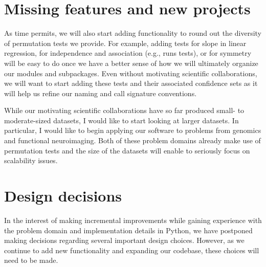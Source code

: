 %
%
%
%
%
%
%
%
%
%
%
%
%
%
%
%

\section{Missing features and new projects}

As time permits, we will also start adding functionality to round out the
diversity of permutation tests we provide.  For example, adding tests for slope
in linear regression, for independence and association (e.g., runs tests), or
for symmetry will be easy to do once we have a better sense of how we will
ultimately organize our modules and subpackages.  Even without motivating
scientific collaborations, we will want to start adding these tests and their
associated confidence sets as it will help us refine our naming and call
signature conventions.

While our motivating scientific collaborations have so far produced small- to
moderate-sized datasets, I would like to start looking at larger datasets.  In
particular, I would like to begin applying our software to problems from
genomics and functional neuroimaging.  Both of these problem domains already
make use of permutation tests and the size of the datasets will enable to
seriously focus on scalability issues.  

\section{Design decisions}

In the interest of making incremental improvements while gaining experience
with the problem domain and implementation details in Python, we have postponed
making decisions regarding several important design choices. However, as we
continue to add new functionality and expanding our codebase, these choices
will need to be made.

